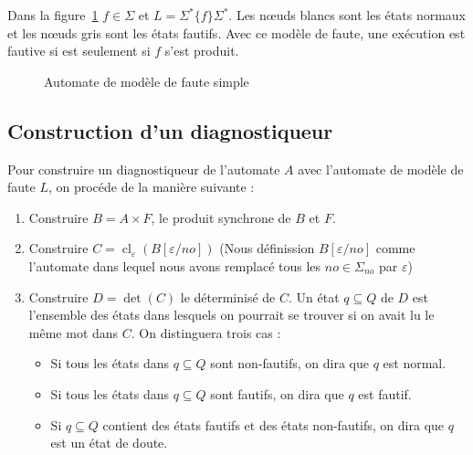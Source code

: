 \documentclass[10pt,a4paper]{article}
\begin{document}
   Dans la figure~\ref{modele de fautes} $f\in \Sigma$ et $L  = \Sigma^*\{f\}\Sigma^*$. Les  nœuds blancs sont les états normaux et les nœuds gris sont les \'etats fautifs. Avec ce mod\`ele de faute, une ex\'ecution est fautive si est seulement si $f$ s'est produit.
        \begin{figure}[H]
                \centering
                \label{modele de fautes}
                \caption{Automate de mod\`ele de faute simple}
        \end{figure}
        
    
    \subsection{Construction d'un diagnostiqueur}
    Pour construire un diagnostiqueur de l'automate $A$ avec l'automate de mod\`ele de faute $L$, on proc\'ede de la mani\`ere suivante :
    
\begin{enumerate}
  \item Construire $B=A\times F$, le produit synchrone de $B$ et $F$.
  \item Construire $C=\operatorname{cl}_\varepsilon(B[\varepsilon/no])$ (Nous d\'efinission $B[\varepsilon/no]$ comme l'automate dans lequel nous avons remplac\'e tous les $no \in \Sigma_{no}$ par $\varepsilon$)
  \item Construire $D=\det(C)$ le d\'eterminis\'e de $C$. Un \'etat $q\subseteq Q$ de $D$ est l'ensemble des \'etats dans lesquels on pourrait se trouver si on avait lu le m\^eme mot dans $C$. On distinguera trois cas :
  \begin{itemize}
    \item Si tous les \'etats dans $q\subseteq Q$ sont non-fautifs, on dira que $q$ est normal.
    \item Si tous les \'etats dans $q\subseteq Q$ sont fautifs, on dira que $q$ est fautif.
    \item Si $q\subseteq Q$ contient des \'etats fautifs et des \'etats non-fautifs, on dira que $q$ est un \'etat de doute.
  \end{itemize}
\end{enumerate} 
     
\end{document}
